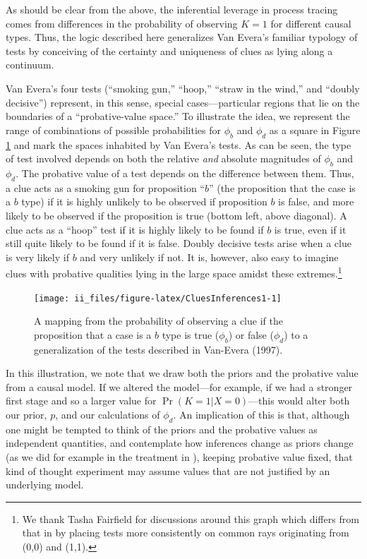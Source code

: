 \documentclass[
  12pt,
]{book}
\begin{document}
As should be clear from the above, the inferential leverage in process tracing comes from differences in the probability of observing \(K=1\) for different causal types. Thus, the logic described here generalizes Van Evera's familiar typology of tests by conceiving of the certainty and uniqueness of clues as lying along a continuum.

Van Evera's four tests (``smoking gun,'' ``hoop,'' ``straw in the wind,'' and ``doubly decisive'') represent, in this sense, special cases---particular regions that lie on the boundaries of a ``probative-value space.'' To illustrate the idea, we represent the range of combinations of possible probabilities for \(\phi_b\) and \(\phi_d\) as a square in Figure \ref{fig:CluesInferences1} and mark the spaces inhabited by Van Evera's tests. As can be seen, the type of test involved depends on both the relative \emph{and} absolute magnitudes of \(\phi_b\) and \(\phi_d\). The probative value of a test depends on the difference between them. Thus, a clue acts as a smoking gun for proposition ``\(b\)'' (the proposition that the case is a \(b\) type) if it is highly unlikely to be observed if proposition \(b\) is false, and more likely to be observed if the proposition is true (bottom left, above diagonal). A clue acts as a ``hoop'' test if it is highly likely to be found if \(b\) is true, even if it still quite likely to be found if it is false. Doubly decisive tests arise when a clue is very likely if \(b\) and very unlikely if not. It is, however, also easy to imagine clues with probative qualities lying in the large space amidst these extremes.\footnote{We thank Tasha Fairfield for discussions around this graph which differs from that in \citet{humphreys2015mixing} by placing tests more consistently on common rays originating from (0,0) and (1,1).}

\begin{figure}

{\centering \texttt{[image: ii\_files/figure-latex/CluesInferences1-1]} 

}

\caption{A mapping from the probability of observing a clue if the proposition that a case is a $b$ type is true ($\phi_b$) or false ($\phi_d$) to a generalization of the tests described in Van-Evera (1997).}\label{fig:CluesInferences1}
\end{figure}

In this illustration, we note that we draw both the priors and the probative value from a causal model. If we altered the model---for example, if we had a stronger first stage and so a larger value for \(\Pr(K=1|X=0)\)---this would alter both our prior, \(p\), and our calculations of \(\phi_d\). An implication of this is that, although one might be tempted to think of the priors and the probative values as independent quantities, and contemplate how inferences change as priors change (as we did for example in the treatment in \citet{humphreys2015mixing}), keeping probative value fixed, that kind of thought experiment may assume values that are not justified by an underlying model.
\end{document}
